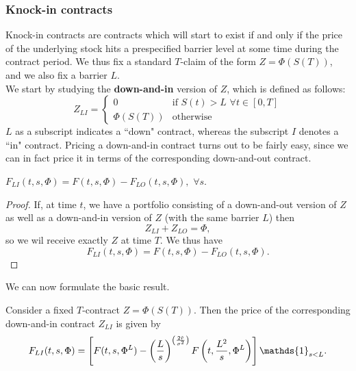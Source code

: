 \subsubsection{Knock-in contracts}
Knock-in contracts are contracts which will start to exist if and only if the price of the underlying stock hits a prespecified barrier level at some time during the contract period. We thus fix a standard $T$-claim of the form $Z = \Phi(S(T))$, and we also fix a barrier $L$. \\
We start by studying the \textbf{down-and-in} version of $Z$, which is defined as follows:
\begin{equation}
    Z_{LI} =
    \begin{cases}
        0 & \text{if } S(t)>L\,\,\forall t\in[0,T] \\
        \Phi(S(T)) & \text{otherwise}
    \end{cases}
\end{equation}
$L$ as a subscript indicates a ``down" contract, whereas the subscript $I$ denotes a ``in" contract. Pricing a down-and-in contract turns out to be fairly easy, since we can in fact price it in terms of the corresponding down-and-out contract.
\begin{lemma}
    $F_{LI}(t, s, \Phi) = F(t, s, \Phi) - F_{LO}(t, s, \Phi),\,\, \forall s$.
\end{lemma}
\begin{proof}
    If, at time $t$, we have a portfolio consisting of a down-and-out version of $Z$ as well as a down-and-in version of $Z$ (with the same barrier $L$) then
    \begin{equation*}
        Z_{LI} + Z_{LO} = \Phi,
    \end{equation*}
    so we wil receive exactly $Z$ at time $T$. We thus have
    \begin{equation*}
        F_{LI} (t, s, \Phi) = F(t, s, \Phi) - F_{LO}(t, s, \Phi).
    \end{equation*}
\end{proof}
We can now formulate the basic result.
\begin{proposition}
    Consider a fixed $T$-contract $Z = \Phi(S(T))$. Then the price of the corresponding down-and-in contract $Z_{LI}$ is given by
    \begin{equation}
        F_{LI}(t,s,\Phi) = \left[F(t,s,\Phi^L)-\left(\frac{L}{s}\right)^{\left(\frac{2\Tilde{r}}{\sigma^2}\right)} F\left(t,\frac{L^2}{s},\Phi^L\right)\right]\mathds{1}_{s<L}.
    \end{equation}
\end{proposition}
